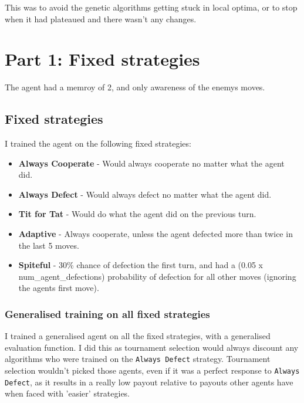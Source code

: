 \documentclass[11pt]{scrartcl} %
\begin{document}
This was to avoid the genetic algorithms getting stuck in local optima, or to stop when it had plateaued and there wasn't any changes.

\section{Part 1: Fixed strategies}
The agent had a memroy of 2, and only awareness of the enemys moves.

\subsection{Fixed strategies}
I trained the agent on the following fixed strategies:
\begin{itemize}
	\item \textbf{Always Cooperate} - Would always cooperate no matter what the agent did.
	\item \textbf{Always Defect} - Would always defect no matter what the agent did.
	\item \textbf{Tit for Tat} - Would do what the agent did on the previous turn.
	\item \textbf{Adaptive} - Always cooperate, unless the agent defected more than twice in the last 5 moves. 
	\item \textbf{Spiteful} - 30\% chance of defection the first turn, and had a (0.05 x num\_agent\_defections) probability of defection for all other moves (ignoring the agents first move).
\end{itemize}


\subsubsection{Generalised training on all fixed strategies}
\label{Training on all fixed strategies}
I trained a generalised agent on all the fixed strategies, with a generalised evaluation function.
I did this as tournament selection would always discount any algorithms who were trained on the \texttt{Always Defect} strategy.
Tournament selection wouldn't picked those agents, even if it was a perfect response to \texttt{Always Defect}, as it results in a really low payout relative to payouts other agents have when faced with 'easier' strategies. 
\end{document}
